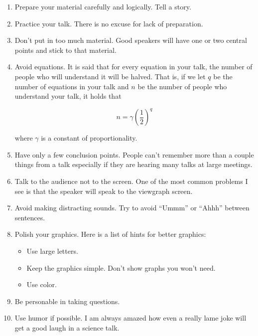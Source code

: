 \documentclass[12pt]{article}
\begin{document}
\begin{enumerate}

\item{Prepare your material carefully and logically. Tell a story.}

\item{Practice your talk. There is no excuse for lack of preparation.}

\item{Don't put in too much material. Good speakers will have one or two central points and stick to that material.}

\item{Avoid equations. It is said that for every equation in your talk, the number of people who will understand it will be halved. That is, if we let $q$ be the number of equations in your talk and $n$ be the number of people who understand your talk, it holds that}

\begin{equation}
n=\gamma \left( \frac{1}{2} \right)^q
\end{equation}

where $\gamma$ is a constant of proportionality.

\item{Have only a few conclusion points. People can't remember more than a couple things from a talk especially if they are hearing many talks at large meetings.}

\item{Talk to the audience not to the screen. One of the most common problems I see is that the speaker will speak to the viewgraph screen.}

\item{Avoid making distracting sounds. Try to avoid ``Ummm'' or ``Ahhh'' between sentences.}

\item{Polish your graphics. Here is a list of hints for better graphics:}

\begin{itemize}

\item{Use large letters.}

\item{Keep the graphics simple. Don't show graphs you won't need.}

\item{Use color.}

\end{itemize}

\item{Be personable in taking questions.}

\item{Use humor if possible. I am always amazed how even a really lame joke will get a good laugh in a science talk.}

\end{enumerate}
\end{document}
